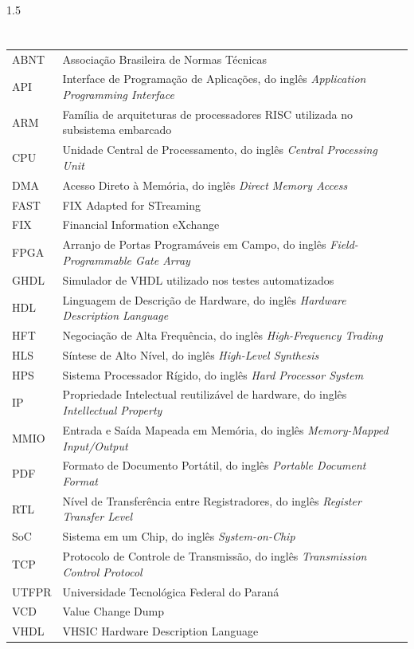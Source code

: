 
\listadeabrevsiglaseacr%

\begin{Spacing}{1.5}
\section*{\nomesiglas}
\begin{tabularx}{\linewidth}{@{}lX@{}}
ABNT  & Associação Brasileira de Normas Técnicas \\
API   & Interface de Programação de Aplicações, do inglês \textit{Application Programming Interface} \\
ARM   & Família de arquiteturas de processadores RISC utilizada no subsistema embarcado \\
CPU   & Unidade Central de Processamento, do inglês \textit{Central Processing Unit} \\
DMA   & Acesso Direto à Memória, do inglês \textit{Direct Memory Access} \\
FAST  & FIX Adapted for STreaming \\
FIX   & Financial Information eXchange \\
FPGA  & Arranjo de Portas Programáveis em Campo, do inglês \textit{Field-Programmable Gate Array} \\
GHDL  & Simulador de VHDL utilizado nos testes automatizados \\
HDL   & Linguagem de Descrição de Hardware, do inglês \textit{Hardware Description Language} \\
HFT   & Negociação de Alta Frequência, do inglês \textit{High-Frequency Trading} \\
HLS   & Síntese de Alto Nível, do inglês \textit{High-Level Synthesis} \\
HPS   & Sistema Processador Rígido, do inglês \textit{Hard Processor System} \\
IP    & Propriedade Intelectual reutilizável de hardware, do inglês \textit{Intellectual Property} \\
MMIO  & Entrada e Saída Mapeada em Memória, do inglês \textit{Memory-Mapped Input/Output} \\
PDF   & Formato de Documento Portátil, do inglês \textit{Portable Document Format} \\
RTL   & Nível de Transferência entre Registradores, do inglês \textit{Register Transfer Level} \\
SoC   & Sistema em um Chip, do inglês \textit{System-on-Chip} \\
TCP   & Protocolo de Controle de Transmissão, do inglês \textit{Transmission Control Protocol} \\
UTFPR & Universidade Tecnológica Federal do Paraná \\
VCD   & Value Change Dump \\
VHDL  & VHSIC Hardware Description Language \\
\end{tabularx}
\end{Spacing}
